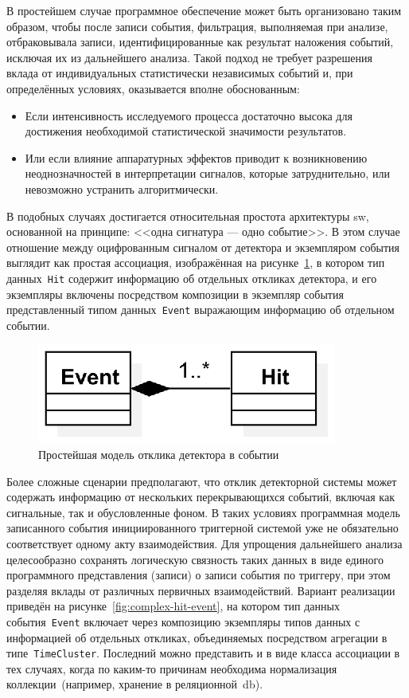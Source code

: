 В простейшем случае программное обеспечение может быть организовано
таким образом, чтобы после записи события, фильтрация, выполняемая при
анализе, отбраковывала записи, идентифицированные как результат
наложения событий, исключая их из дальнейшего анализа.
Такой подход не требует разрешения вклада от индивидуальных
статистически независимых событий и, при определённых условиях, оказывается
вполне обоснованным:
\begin{itemize}
    \item Если интенсивность исследуемого процесса достаточно высока для
    достижения необходимой статистической значимости результатов.
    \item Или если влияние аппаратурных эффектов приводит к возникновению
    неоднозначностей в интерпретации сигналов, которые затруднительно, или
    невозможно устранить алгоритмически.
\end{itemize}

В подобных случаях достигается относительная простота архитектуры \acrshort{sw},
основанной на принципе: <<одна сигнатура — одно событие>>.
В этом случае отношение между оцифрованным сигналом от детектора и
экземпляром события выглядит как простая ассоциация, изображённая на
рисунке~\ref{fig:simple-hit-event}, в котором тип данных~\texttt{Hit}
содержит информацию об отдельных откликах детектора, и его экземпляры
включены посредством композиции в экземпляр события представленный
типом данных~\texttt{Event} выражающим информацию об отдельном событии.

\begin{figure}[ht!]
    \centering
    \includegraphics[width=0.25\linewidth]{images/illustrative/simple-event-struct.eps}
    \caption{Простейшая модель отклика детектора в событии}
    \label{fig:simple-hit-event}
\end{figure}

Более сложные сценарии предполагают, что отклик детекторной системы
может содержать информацию от нескольких перекрывающихся событий, включая
как сигнальные, так и обусловленные фоном. В таких условиях программная
модель записанного события инициированного триггерной системой уже не
обязательно соответствует одному акту взаимодействия.
Для упрощения дальнейшего анализа целесообразно
сохранять логическую связность таких данных в виде единого программного
представления (записи) о записи события по триггеру, при этом разделяя вклады
от различных первичных взаимодействий. Вариант реализации приведён на
рисунке~\ref{fig:complex-hit-event}, на котором тип данных события~\texttt{Event}
включает через композицию экземпляры типов данных с информацией об отдельных
откликах, объединяемых посредством агрегации в типе~\texttt{TimeCluster}.
Последний можно представить и в виде класса ассоциации в тех случаях, когда
по каким-то причинам необходима нормализация коллекции~(например, хранение в реляционной~\acrshort{db}).

